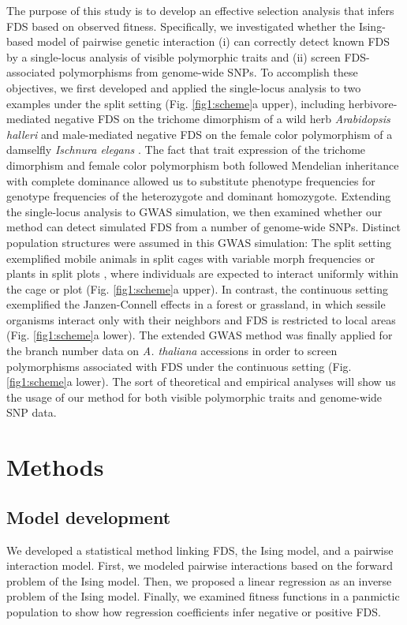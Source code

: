 \documentclass[12pt,]{article}
\begin{document}
The purpose of this study is to develop an effective selection analysis that infers FDS based on observed fitness. Specifically, we investigated whether the Ising-based model of pairwise genetic interaction (i) can correctly detect known FDS by a single-locus analysis of visible polymorphic traits and (ii) screen FDS-associated polymorphisms from genome-wide SNPs. To accomplish these objectives, we first developed and applied the single-locus analysis to two examples under the split setting (Fig. \ref{fig1:scheme}a upper), including herbivore-mediated negative FDS on the trichome dimorphism of a wild herb \textit{Arabidopsis halleri} \citep{sato2017herbivore} and male-mediated negative FDS on the female color polymorphism of a damselfly \textit{Ischnura elegans} \citep{takahashi2014evolution}. The fact that trait expression of the trichome dimorphism and female color polymorphism both followed Mendelian inheritance with complete dominance \citep{shimizu2002ecology,sanchez2005hybridization,kawagoe2011coexistence} allowed us to substitute phenotype frequencies for genotype frequencies of the heterozygote and dominant homozygote. Extending the single-locus analysis to GWAS simulation, we then examined whether our method can detect simulated FDS from a number of genome-wide SNPs. Distinct population structures were assumed in this GWAS simulation: The split setting exemplified mobile animals in split cages with variable morph frequencies \citep{takahashi2014evolution} or plants in split plots \citep{sato2017herbivore}, where individuals are expected to interact uniformly within the cage or plot (Fig. \ref{fig1:scheme}a upper). In contrast, the continuous setting exemplified the Janzen-Connell effects \citep{janzen1970herbivores, connell1971role} in a forest or grassland, in which sessile organisms interact only with their neighbors and FDS is restricted to local areas (Fig. \ref{fig1:scheme}a lower). The extended GWAS method was finally applied for the branch number data on \textit{A. thaliana} accessions in order to screen polymorphisms associated with FDS under the continuous setting (Fig. \ref{fig1:scheme}a lower). The sort of theoretical and empirical analyses will show us the usage of our method for both visible polymorphic traits and genome-wide SNP data.


\section{Methods}

\subsection{Model development}
We developed a statistical method linking FDS, the Ising model, and a pairwise interaction model. First, we modeled pairwise interactions based on the forward problem of the Ising model. Then, we proposed a linear regression as an inverse problem of the Ising model. Finally, we examined fitness functions in a panmictic population to show how regression coefficients infer negative or positive FDS.
\end{document}
